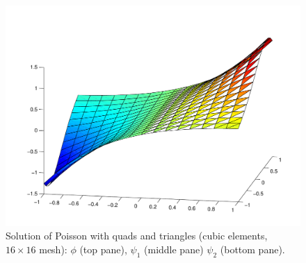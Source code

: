 \begin{figure}[h!b!h!]
\begin{center}
\includegraphics[height=0.27\textheight]{plots/poissonHybrid/psi2cubic16x16.pdf}
\caption{Solution of Poisson with quads and triangles (cubic elements, $16 \times 16$ mesh):
$\phi$ (top pane),
$\psi_{1}$ (middle pane)
$\psi_{2}$ (bottom pane).}
\label{NVR:fig:Poisson}
\end{center}\end{figure}

